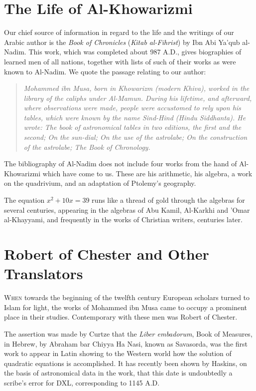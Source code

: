 \documentclass[11pt,a4paper]{book}
\begin{document}
\section{The Life of Al-Khowarizmi}

Our chief source of information in regard to the life and the writings of our Arabic author is the \textit{Book of Chronicles} (\textit{Kitab al-Fihrist}) by Ibn Abi Ya'qub al-Nadim. This work, which was completed about 987 A.D., gives biographies of learned men of all nations, together with lists of such of their works as were known to Al-Nadim. We quote the passage relating to our author:

\begin{quote}
\textit{Mohammed ibn Musa, born in Khowarizm (modern Khiva), worked in the library of the caliphs under Al-Mamun. During his lifetime, and afterward, where observations were made, people were accustomed to rely upon his tables, which were known by the name Sind-Hind (Hindu Siddhanta). He wrote: The book of astronomical tables in two editions, the first and the second; On the sun-dial; On the use of the astrolabe; On the construction of the astrolabe; The Book of Chronology.}
\end{quote}

The bibliography of Al-Nadim does not include four works from the hand of Al-Khowarizmi which have come to us. These are his arithmetic, his algebra, a work on the quadrivium, and an adaptation of Ptolemy's geography.

The equation $x^2 + 10x = 39$ runs like a thread of gold through the algebras for several centuries, appearing in the algebras of Abu Kamil, Al-Karkhi and 'Omar al-Khayyami, and frequently in the works of Christian writers, centuries later.

\section{Robert of Chester and Other Translators}

\lettrine[lines=3]{W}{hen} towards the beginning of the twelfth century European scholars turned to Islam for light, the works of Mohammed ibn Musa came to occupy a prominent place in their studies. Contemporary with these men was Robert of Chester.

The assertion was made by Curtze that the \textit{Liber embadorum}, Book of Measures, in Hebrew, by Abraham bar Chiyya Ha Nasi, known as Savasorda, was the first work to appear in Latin showing to the Western world how the solution of quadratic equations is accomplished. It has recently been shown by Haskins, on the basis of astronomical data in the work, that this date is undoubtedly a scribe's error for DXL, corresponding to 1145 A.D.
\end{document}
